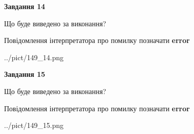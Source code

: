 \documentclass[11pt, ukrainian]{article}
\begin{document}
{\begin {large}
{\begin {center}\textbf{Завдання 14}\end {center}}\par
Що буде виведено за виконання? \par
Повідомлення інтерпретатора про помилку позначати \textbf{error}

\begin{center}
	{../pict/149_14.png}
\end{center}
\newpage

{\begin {center}\textbf{Завдання 15}\end {center}}\par
Що буде виведено за виконання? \par
Повідомлення інтерпретатора про помилку позначати \textbf{error}

\begin{center}
	{../pict/149_15.png}
\end{center}
\newpage

\end {large}}
\end{document}
